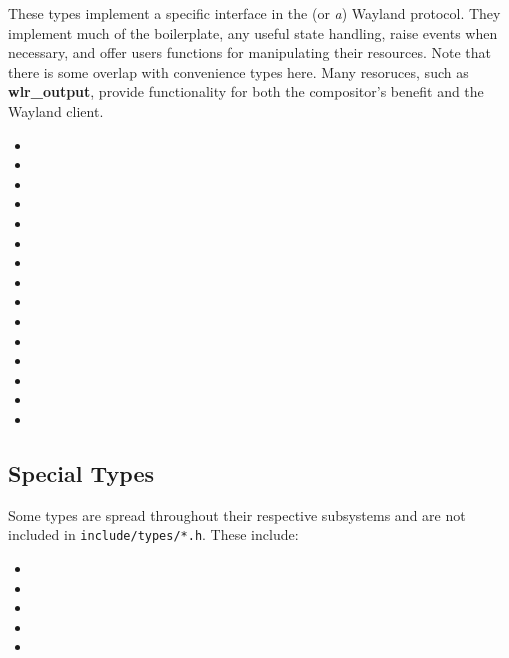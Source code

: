 \documentclass{article}
\newcommand{\code}[1]{\texttt{#1}}
\begin{document}
These types implement a specific interface in the (or \emph{a}) Wayland
protocol. They implement much of the boilerplate, any useful state handling,
raise events when necessary, and offer users functions for manipulating their
resources. Note that there is some overlap with convenience types here. Many
resoruces, such as \textbf{wlr_output}, provide functionality for both the
compositor's benefit and the Wayland client.

\begin{itemize}
    \itemsep0em
    \item {}
    \item {}
    \item {}
    \item {}
    \item {}
    \item {}
    \item {}
    \item {}
    \item {}
    \item {}
    \item {}
    \item {}
    \item {}
    \item {}
    \item {}
\end{itemize}

\subsection{Special Types}\label{special types}

Some types are spread throughout their respective subsystems and are not
included in \code{include/types/*.h}. These include:

\begin{itemize}
    \itemsep0em
    \item {}
    \item {}
    \item {}
    \item {}
    \item {}
\end{itemize}
\end{document}
